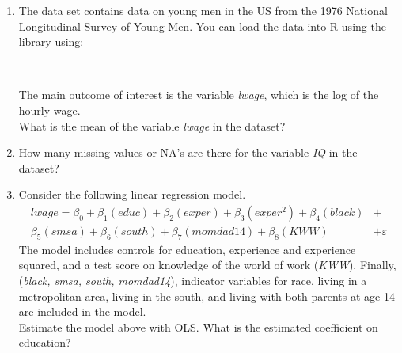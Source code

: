 \def\examid{26101200004}

\begin{enumerate}
\item {}
The data set  contains data on young men in the US from the 1976 National Longitudinal Survey of Young Men. You can load the data into R using the  library using:

\medskip
{}\\
\medskip

The main outcome of interest is the variable \textit{lwage}, which is the log of the hourly wage.\\
What is the mean of the variable \textit{lwage} in the dataset?

\item How many missing values or NA's are there for the variable \textit{IQ} in the dataset?

\item Consider the following linear regression model.
\[\begin{aligned}
lwage = \beta_0 + \beta_1(educ) + \beta_2(exper) + \beta_3(exper^2) + \beta_4(black) &+ \\
\beta_5(smsa) + \beta_6(south) + \beta_7(momdad14) + \beta_8(KWW) &+ \varepsilon
\end{aligned}\]
The model includes controls for education, experience and experience squared, and a test score on knowledge of the world of work (\textit{KWW}). Finally, (\textit{black, smsa, south, momdad14}), indicator variables for race, living in a metropolitan area, living in the south, and living with both parents at age 14 are included in the model.\\
Estimate the model above with OLS. What is the estimated coefficient on education?


\end{enumerate}
